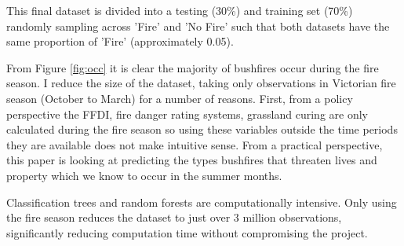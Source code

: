 \documentclass[11pt,a4paper]{article}
\begin{document}
	
	This final dataset is divided into a testing (30\%) and training set (70\%) randomly sampling across 'Fire' and 'No Fire' such that both datasets have the same proportion of 'Fire' (approximately 0.05). 
	
	
		
		
		From Figure \ref{fig:occ} it is clear the majority of bushfires occur during the fire season. I reduce the size of the dataset, taking only observations in Victorian fire season (October to March) for a number of reasons. First, from a policy perspective the FFDI, fire danger rating systems, grassland curing are only calculated during the fire season so using these variables outside the time periods they are available does not make intuitive sense. From a practical perspective, this paper is looking at predicting the types bushfires that threaten lives and property which we know to occur in the summer months. 
		
			Classification trees and random forests are computationally intensive. Only using the fire season reduces the dataset to just over 3 million observations, significantly reducing computation time without compromising the project. 
			
\end{document}
